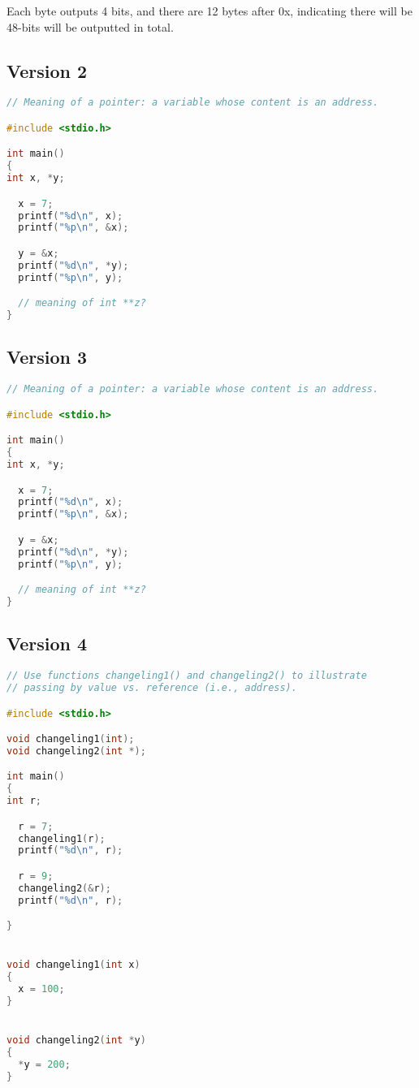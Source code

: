 \documentclass{article}
\begin{document}
    Each byte outputs 4 bits, and there are 12 bytes after 0x, indicating there will be 48-bits will be outputted in total.

    \subsection*{Version 2}
    \begin{lstlisting}[language=C]
// Meaning of a pointer: a variable whose content is an address.

#include <stdio.h>

int main()
{
int x, *y;

  x = 7;
  printf("%d\n", x);
  printf("%p\n", &x);

  y = &x;
  printf("%d\n", *y);
  printf("%p\n", y);

  // meaning of int **z?
}
    \end{lstlisting}

    \subsection*{Version 3}
    \begin{lstlisting}[language=C]
// Meaning of a pointer: a variable whose content is an address.

#include <stdio.h>

int main()
{
int x, *y;

  x = 7;
  printf("%d\n", x);
  printf("%p\n", &x);

  y = &x;
  printf("%d\n", *y);
  printf("%p\n", y);

  // meaning of int **z?
}
    \end{lstlisting}

    \subsection*{Version 4}
    \begin{lstlisting}[language=C]
    // Use functions changeling1() and changeling2() to illustrate
// passing by value vs. reference (i.e., address).

#include <stdio.h>

void changeling1(int);
void changeling2(int *);

int main()
{
int r;

  r = 7;
  changeling1(r);
  printf("%d\n", r);

  r = 9;
  changeling2(&r);
  printf("%d\n", r);

}


void changeling1(int x)
{
  x = 100;
}


void changeling2(int *y)
{
  *y = 200;
}
    \end{lstlisting}
\end{document}
